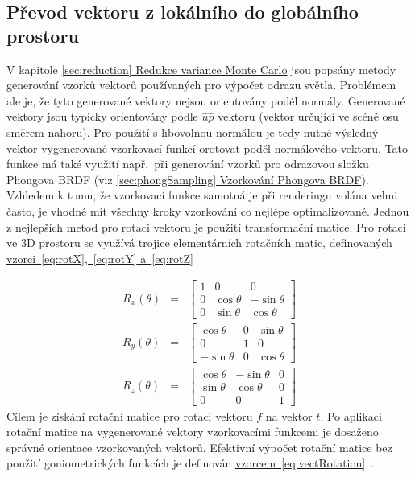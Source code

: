 \documentclass[czech,master]{diploma}
\newcommand{\uvec}[1]{\hat{#1}}
\newcommand{\fromVect}{f}
\newcommand{\toVect}{t}
\begin{document}
\subsection{Převod vektoru z lokálního do globálního prostoru}
V kapitole \hyperref[sec:reduction]{\ref{sec:reduction} Redukce variance Monte Carlo} jsou popsány metody generování vzorků vektorů používaných pro výpočet odrazu světla. Problémem ale je, že tyto generované vektory nejsou orientovány podél normály. Generované vektory jsou typicky orientovány podle \(\uvec{up}\) vektoru (vektor určující ve scéně osu směrem nahoru). Pro použití s libovolnou normálou je tedy nutné výsledný vektor vygenerované vzorkovací funkcí orotovat podél normálového vektoru. Tato funkce má také využití např.\ při generování vzorků pro odrazovou složku Phongova BRDF (viz \hyperref[sec:phongSampling]{\ref{sec:phongSampling} Vzorkování Phongova BRDF}). Vzhledem k tomu, že vzorkovací funkce samotná je při renderingu volána velmi často, je vhodné mít všechny kroky vzorkování co nejlépe optimalizované. Jednou z nejlepších metod pro rotaci vektoru je použití transformační matice. Pro rotaci ve 3D prostoru se využívá trojice elementárních rotačních matic, definovaných \hyperref[eq:rotX]{vzorci~\ref{eq:rotX},~\ref{eq:rotY} a~\ref{eq:rotZ}}~\cite{HughesDamEtAl13}\par
\begin{eqnarray}
  R_x(\theta) & = & \begin{bmatrix}
    1 & 0          & 0           \\
    0 & \cos\theta & -\sin\theta \\
    0 & \sin\theta & \cos\theta
  \end{bmatrix} \label{eq:rotX} \\
  R_y(\theta) & = & \begin{bmatrix}
    \cos\theta  & 0 & \sin\theta \\
    0           & 1 & 0          \\
    -\sin\theta & 0 & \cos\theta
  \end{bmatrix} \label{eq:rotY} \\
  R_z(\theta) & = & \begin{bmatrix}
    \cos\theta & -\sin\theta & 0 \\
    \sin\theta & \cos\theta  & 0 \\
    0          & 0           & 1
  \end{bmatrix}\label{eq:rotZ}
\end{eqnarray}
Cílem je získání rotační matice pro rotaci vektoru \(\fromVect\) na vektor \(\toVect\). Po aplikaci rotační matice na vygenerované vektory vzorkovacími funkcemi je dosaženo správné orientace vzorkovaných vektorů. Efektivní výpočet rotační matice bez použití goniometrických funkcích je definován \hyperref[eq:vectRotation]{vzorcem~\ref{eq:vectRotation}}~\cite{MollerHughesVectRotation}.
\end{document}
